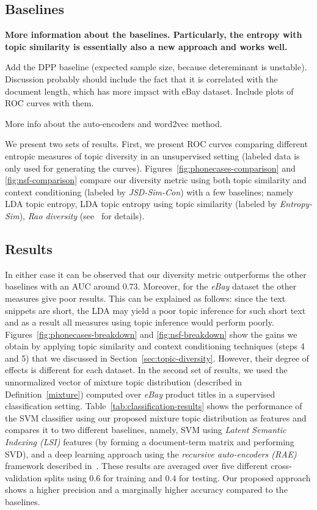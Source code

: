 \documentclass{article}
\begin{document}
\subsection{Baselines}
\label{sec:baselines}
{\bf More information about the baselines. Particularly, the entropy
  with topic similarity is essentially also a new approach and works
  well. 

Add the DPP baseline (expected sample size, because detereminant is
unstable). Discussion probably
should include the fact that it is correlated with the document
length, which has more impact with eBay dataset. Include plots of ROC
curves with them.

More info about the auto-encoders and word2vec method.}

We present two sets of results. First, we present
ROC curves comparing different entropic measures of topic diversity in an unsupervised setting 
(labeled data is only used for generating the curves). Figures~\ref{fig:phonecases-comparison} and \ref{fig:nsf-comparison}
compare our diversity metric using both topic similarity and context
conditioning (labeled by {\em JSD-Sim-Con}) with a few baselines;
namely LDA topic entropy, LDA topic entropy using topic similarity
(labeled by {\em Entropy-Sim}), {\em Rao diversity}
(see~\cite{bache:2013} for details). 

\subsection{Results}
\label{sec:results}
In either case it can be observed
that our diversity metric outperforms the other baselines with an AUC
around $0.73$. Moreover, for the {\em eBay} dataset the other measures
give poor results. This can be explained as follows: since the
text snippets are short, the LDA may yield a poor topic inference for such short text and as a result all measures using topic inference would perform poorly. Figures~\ref{fig:phonecases-breakdown} and \ref{fig:nsf-breakdown} show the gains we obtain by applying topic similarity and context conditioning techniques (steps 4 and 5) that we discussed in Section~\ref{sec:topic-diversity}. However, their degree of effects is different for each
dataset.  In the second set of results, we used the unnormalized vector of mixture topic
distribution (described in Definition~\ref{mixture}) computed over
{\em eBay} product titles in a supervised classification
setting. Table~\ref{tab:classification-results} shows
the performance of the SVM classifier using our proposed mixture topic
distribution as features and compares it to two different baselines, namely, SVM using
{\em Latent Semantic Indexing (LSI)} features (by forming a
document-term matrix and performing SVD), and a deep learning approach
using the {\em recursive auto-encoders (RAE)} framework described
in~\cite{Socher:2011:SRA:2145432.2145450}. These results are averaged
over five different cross-validation splits using $0.6$ for training
and $0.4$ for testing. Our proposed approach shows a higher precision
and a marginally higher accuracy compared to the baselines.
\end{document}

